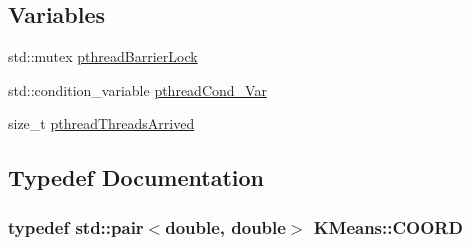 \subsection*{Variables}
\begin{DoxyCompactItemize}
\item 
std\-::mutex \hyperlink{namespaceKMeans_a5219c2c9759a95b517b455049f6563de}{pthread\-Barrier\-Lock}
\item 
std\-::condition\-\_\-variable \hyperlink{namespaceKMeans_a1001aa3caa40eaebdd2d3d500f313348}{pthread\-Cond\-\_\-\-Var}
\item 
size\-\_\-t \hyperlink{namespaceKMeans_ad847e407438dfefa275c4be95c2b46ef}{pthread\-Threads\-Arrived}
\end{DoxyCompactItemize}


\subsection{Typedef Documentation}
\hypertarget{namespaceKMeans_a32ce08f4c8b30171faaeff5a3a466f30}{
\subsubsection[{C\-O\-O\-R\-D}]{\setlength{\rightskip}{0pt plus 5cm}typedef std\-::pair$<$double, double$>$ {\bf K\-Means\-::\-C\-O\-O\-R\-D}}}\label{namespaceKMeans_a32ce08f4c8b30171faaeff5a3a466f30}


